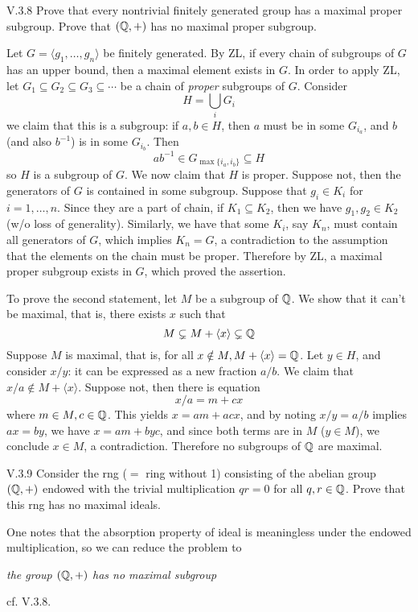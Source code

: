 \begin{problem}{V.3.8}
Prove that every nontrivial finitely generated group has a maximal proper subgroup. Prove that $(\mathbb{Q},+)$ has no maximal proper subgroup.
\end{problem}
\begin{pf}
Let $G = \langle g_1,\dotsc,g_n \rangle$ be finitely generated. By ZL, if every chain of subgroups of $G$ has an upper bound, then a maximal element exists in $G$. In order to apply ZL, let $G_1 \subseteq G_2 \subseteq G_3 \subseteq \cdots$ be a chain of \emph{proper} subgroups of $G$. Consider
\[
H = \bigcup_{i}G_i
\]
we claim that this is a subgroup: if $a,b \in H$, then $a$ must be in some $G_{i_a}$, and $b$ (and also $b^{-1}$) is in some $G_{i_b}$. Then
\[
ab^{-1} \in G_{\max\{i_a,i_b\}} \subseteq H
\]
so $H$ is a subgroup of $G$. We now claim that $H$ is proper. Suppose not, then the generators of $G$ is contained in some subgroup. Suppose that $g_i \in K_i$ for $i = 1,\dotsc,n$. Since they are a part of chain, if $K_1 \subseteq K_2$, then we have $g_1,g_2 \in K_2$(w/o loss of generality). Similarly, we have that some $K_i$, say $K_n$, must contain all generators of $G$, which implies $K_n = G$, a contradiction to the assumption that the elements on the chain must be proper. Therefore by ZL, a maximal proper subgroup exists in $G$, which proved the assertion.

To prove the second statement, let $M$ be a subgroup of $\mathbb{Q}$. We show that it can't be maximal, that is, there exists $x$ such that 
\[
M \subsetneq M + \langle x \rangle \subsetneq \mathbb{Q}
\]
Suppose $M$ is maximal, that is, for all $x \notin M, M+ \langle x \rangle = \mathbb{Q}$. Let $y \in H$, and consider $x/y$: it can be expressed as a new fraction $a/b$. We claim that $x/a \notin M+ \langle x \rangle$. Suppose not, then there is equation
\[
x/a = m + cx
\]
where $m \in M, c \in \mathbb{Q}$. This yields $x = am + acx$, and by noting $x/y = a/b$ implies $ax = by$, we have $x = am+byc$, and since both terms are in $M$ ($y \in M$), we conclude $x \in M$, a contradiction. Therefore no subgroups of $\mathbb{Q}$ are maximal.
\end{pf}

\begin{problem}{V.3.9}
Consider the rng ($=$ ring without 1) consisting of the abelian group $(\mathbb{Q},+)$ endowed with the trivial multiplication $qr=0$ for all $q,r \in \mathbb{Q}$. Prove that this rng has no maximal ideals.
\end{problem}
\begin{pf}
One notes that the absorption property of ideal is meaningless under the endowed multiplication, so we can reduce the problem to
\begin{center}
\emph{the group $(\mathbb{Q},+)$ has no maximal subgroup}
\end{center}
cf. V.3.8.

\end{pf}

